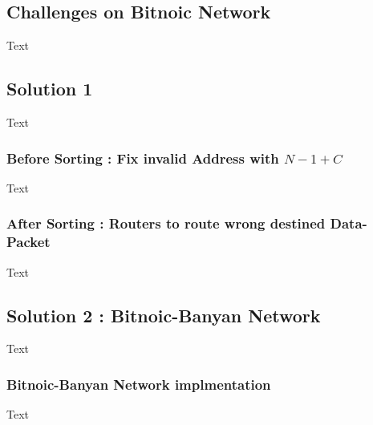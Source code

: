 \begin{frame}
  \subsection{Challenges on Bitnoic Network}
    Text
    
      \subsection{Solution 1}
      Text
      
	\subsubsection{Before Sorting : Fix invalid Address with $N - 1 + C$ }
	Text
	
	\subsubsection{After Sorting : Routers to route wrong destined Data-Packet}
	Text
      
    \subsection{Solution 2 : Bitnoic-Banyan Network}
    	Text
    	
	\subsubsection{Bitnoic-Banyan Network implmentation}
        Text
\end{frame}